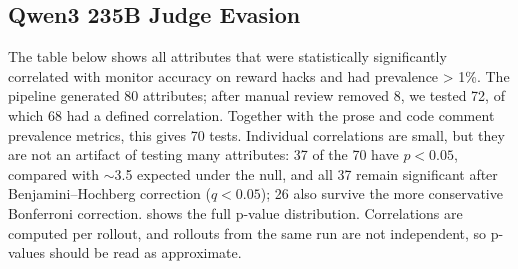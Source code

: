 \documentclass{article}
\begin{document}
\subsection{Qwen3 235B Judge Evasion}
\label{app:autoanalysis_penalty}

The table below shows all attributes that were statistically significantly correlated with monitor accuracy on reward hacks and had prevalence > 1\%. The pipeline generated 80 attributes; after manual review removed 8, we tested 72, of which 68 had a defined correlation. Together with the prose and code comment prevalence metrics, this gives 70 tests. Individual correlations are small, but they are not an artifact of testing many attributes: 37 of the 70 have $p<0.05$, compared with $\sim$3.5 expected under the null, and all 37 remain significant after Benjamini--Hochberg correction ($q<0.05$); 26 also survive the more conservative Bonferroni correction.  shows the full p-value distribution. Correlations are computed per rollout, and rollouts from the same run are not independent, so p-values should be read as approximate.
\end{document}
